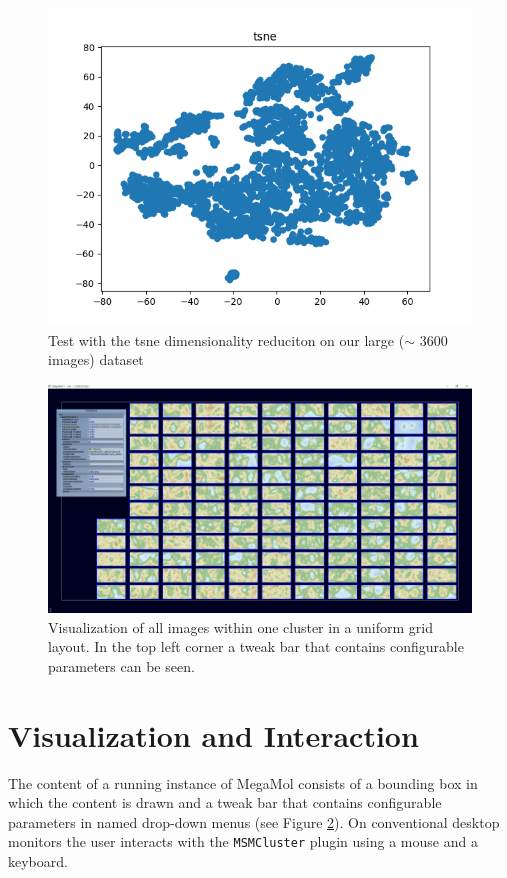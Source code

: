 \documentclass[journal]{vgtc}       %
\begin{document}
\begin{figure}[tb]
	\begin{center}
		\includegraphics[width=.75\linewidth]{tsneFull.png}
	\end{center}
	\caption{\label{fig:tsnef} Test with the tsne dimensionality reduciton on our large ($\sim$ 3600 images) dataset}
\end{figure}

\begin{figure}[h!]
	\begin{center}
		\includegraphics[width= \linewidth]{gridLayout.png}
	\end{center}
	\caption{\label{fig:grid} Visualization of all images within one cluster in a uniform grid layout. In the top left corner a tweak bar that contains configurable parameters can be seen.}
\end{figure}

\section{Visualization and Interaction}
The content of a running instance of MegaMol consists of a bounding box in which the content is drawn and a tweak bar that contains configurable parameters in  named drop-down menus (see Figure \ref{fig:grid}). On conventional desktop monitors the user interacts with the \verb|MSMCluster| plugin using a mouse and  a keyboard.
\end{document}
